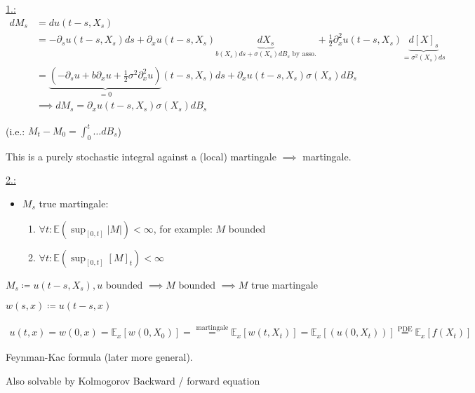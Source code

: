 \underline{1.:}
\begin{align*}
    dM_s&=du(t-s,X_s)\\
    &=-\partial_s u(t-s,X_s)ds+\partial_x u(t-s,X_s) \underbrace{dX_s}_{b(X_s)ds+\sigma(X_s)dB_s\text{ by asso.}} + \frac{1}{2}\partial_{x}^2 u(t-s,X_s)\underbrace{d[X]_s}_{=\sigma^2(X_s)ds}\\
    &=\underbrace{(-\partial_s u + b\partial_x u+\frac{1}{2}\sigma^2\partial_x^2u)}_{=0}(t-s,X_s)ds+\partial_x u(t-s,X_s)\sigma(X_s)dB_s\\
    &\implies dM_s = \partial_x u(t-s,X_s)\sigma(X_s)dB_s
\end{align*}

(i.e.: $M_t-M_0=\int_0^t\dots dB_s$) 

This is a purely stochastic integral against a (local) martingale $\implies$ martingale.

\underline{2.:}

\begin{itemize}
    \item $M_s$ true martingale: \begin{enumerate}
        \item $\forall t:\mathbb{E}(\sup_{[0,t]} |M|)<\infty$, for example: $M$ bounded
        \item $\forall t:\mathbb{E}(\sup_{[0,t]} [M]_t)<\infty$
    \end{enumerate}
\end{itemize}

$M_s\coloneqq u(t-s,X_s),u$ bounded $\implies M$ bounded $\implies M$ true martingale

$w(s,x)\coloneqq u(t-s,x)$

\begin{align*}
    u(t,x)=w(0,x)=\mathbb{E}_x[w(0,X_0)]=\stackrel{\text{martingale}}{=}\mathbb{E}_x[w(t,X_t)]=\mathbb{E}_x[(u(0,X_t))]\stackrel{\text{PDE}}{=}\mathbb{E}_x[f(X_t)]
\end{align*}

Feynman-Kac formula (later more general). 

Also solvable by Kolmogorov Backward / forward equation